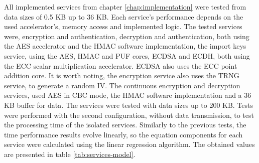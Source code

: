 All implemented services from chapter \ref{chap:implementation} were tested from data sizes of 0.5 KB up to 36 KB. Each service's performance depends on the used accelerator's, memory access and implemented logic.
The tested services were, encryption and authentication, decryption and authentication, both using the AES accelerator and the HMAC software implementation, the import keys service, using the AES, HMAC and PUF cores, ECDSA and ECDH, both using the ECC scalar multiplication accelerator. ECDSA also uses the ECC point addition core. It is worth noting, the encryption service also uses the TRNG service, to generate a random IV. The continuous encryption and decryption services, used AES in CBC mode, the HMAC software implementation and a 36 KB buffer for data. The services were tested with data sizes up to 200 KB.
Tests were performed with the second configuration, without data transmission, to test the processing time of the isolated services.
Similarly to the previous tests, the time performance results evolve linearly, so the equation components for each service were calculated using the linear regression algorithm. The obtained values are presented in table \ref{tab:services-model}.




